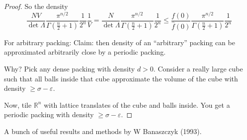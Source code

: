 \documentclass{report}
\newcommand{\R}{\mathbb{R}}
\theoremstyle{definition}
\theoremstyle{remark}
\numberwithin{equation}{section}
\begin{document}
\begin{proof}
    So the density \[\frac{NV}{\det\Lambda}\frac{\pi^{n/2}}{\Gamma\left(\frac{n}{2}+1\right)}\frac{1}{2^n}\frac{1}{V} = \frac{N}{\det\Lambda}\frac{\pi^{n/2}}{\Gamma\left(\frac{n}{2}+1\right)}\frac{1}{2^n}\leq\frac{f(0)}{\widehat{f}(0)}\frac{\pi^{n/2}}{\Gamma\left(\frac{n}{2}+1\right)}\frac{1}{2^n}\]

    For arbitrary packing:
    Claim: then density of an ``arbitrary'' packing can be approximated arbitrarily close by a periodic packing.

    Why? Pick any dense packing with density $d > 0$. Consider a really large cube such that all balls inside that cube approximate the volume of the cube with density $\geq \sigma - \varepsilon$.

    Now, tile $\R^n$ with lattice translates of the cube and balls inside. You get a periodic packing with density $\geq \sigma - \varepsilon$.
\end{proof}

A bunch of useful results and methods by W Banaszczyk (1993).
\end{document}
